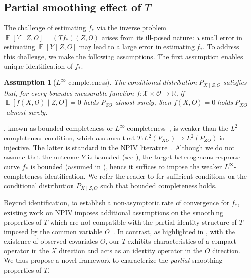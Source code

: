 \documentclass[11pt]{article}
\newcommand{\calO}{\mathcal{O}}
\newcommand{\calX}{\mathcal{X}}
\newcommand{\R}{\mathbb{R}}
\newcommand{\0}{\mathbf{0}}
\DeclareMathOperator{\E}{\mathbb{E}}
\newtheorem{ass}{Assumption}[section]
\begin{document}
\subsection{Partial smoothing effect of $T$}\label{sec:ill_posedness}
The challenge of estimating $f_\ast$ via the inverse problem
$\E[Y \mid Z, O]=(T f_*)(Z, O)$ arises from its ill-posed nature: a small error in estimating $\E[Y \mid Z, O]$ may lead to a large error in estimating $f_\ast$. 
To address this challenge, we make the following assumptions. 
The first assumption enables unique identification of $f_\ast$.
\begin{ass}[$L^{\infty}$-completeness]\label{ass:T_injective}
The conditional distribution $P_{X\mid Z,O}$ satisfies that, for every bounded measurable function $f:\calX\times\calO\to\R$, if $\E[f(X,O)\mid Z, O] = 0$ holds $P_{ZO}$-almost surely, then $f(X,O)=0$ holds $P_{XO}$-almost surely.
\end{ass}
, known as bounded completeness or $L^{\infty}$-completeness~\citep{d2011completeness, blundell2007semi}, is weaker than the $L^2$-completeness condition, which assumes that $T: L^2(P_{XO})\to L^2(P_{ZO})$ is injective. The latter is standard in the NPIV literature~\citep{newey_2003, HallHorowitz2005, carrasco2007linear,darolles2011nonparametric,  andrews2017examples, chen2014local, Chen_2018, chen2024adaptiveestimationuniformconfidence}.
Although we do not assume that the outcome $Y$ is bounded (see ), the target heterogenous response curve $f_\ast$ is bounded (assumed in ), hence it suffices to impose the weaker $L^\infty$-completeness identification.
We refer the reader to \citet{andrews2017examples, d2011completeness} for sufficient conditions on the conditional distribution $P_{X\mid Z,O}$ such that bounded completeness holds.

Beyond identification, to establish a non-asymptotic rate of convergence for $f_\ast$, existing work on NPIV imposes additional assumptions on the smoothing properties of $T$ which are not compatible with the partial identity structure of $T$ imposed by the common variable $O$~\citep{blundell2007semi,Chen_2018,chen2011rate}. 
In contrast, as highlighted in , with the existence of observed covariates $O$, our $T$ exhibits characteristics of a compact operator in the $X$ direction and acts as an identity operator in the $O$ direction. We thus propose a novel framework to characterize the \emph{partial} smoothing properties of $T$. 
\end{document}
